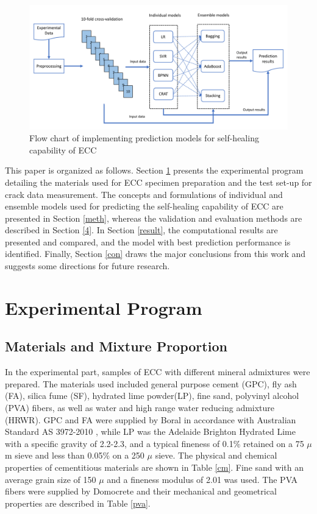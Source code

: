 \documentclass[11pt]{article}
\begin{document}
	\begin{figure}	
		\begin{center}
			\includegraphics[width=\textwidth]{structure.pdf}
		\end{center}
		\caption{Flow chart of implementing prediction models for self-healing capability of ECC}
		\label{fig:structure}
	\end{figure}
	
	
	This paper is organized as follows.  Section \ref{lab} presents the experimental program detailing the materials used for ECC specimen preparation and the test set-up for crack data measurement. The concepts and formulations of individual and ensemble models used for predicting the self-healing capability of ECC are presented in Section \ref{meth}, whereas the validation and evaluation methods are described in Section \ref{4}. In Section \ref{result}, the computational results are presented and compared, and the model with best prediction performance is identified. Finally, Section \ref{con} draws the major conclusions from this work and suggests some directions for future research.
	
	
	\section{Experimental Program}
	\label{lab}
	
	\subsection{Materials and Mixture Proportion}
	In the experimental part, samples of ECC with different mineral admixtures were prepared. The materials used included general purpose cement (GPC), fly ash (FA), silica fume (SF), hydrated lime powder(LP), fine sand, polyvinyl alcohol (PVA) fibers, as well as water and high range water reducing admixture (HRWR). GPC and FA were supplied by Boral in accordance with Australian Standard AS 3972-2010 \cite{noauthor_as_nodate}, while LP was the Adelaide Brighton Hydrated Lime with a specific gravity of 2.2-2.3, and a typical fineness of 0.1\% retained on a 75 $\mu$m sieve and less than 0.05\% on a 250 $\mu$ sieve. The physical and chemical properties of cementitious materials are shown in Table \ref{cm}. Fine sand with an average grain size of 150 $\mu$ and a fineness modulus of 2.01 was used. The PVA fibers were supplied by Domocrete and their mechanical and geometrical properties are described in Table \ref{pva}.
\end{document}
